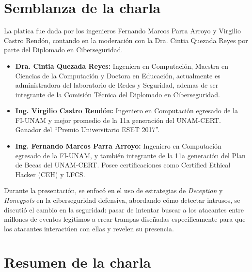 \documentclass[letterpaper,11pt]{article}
\begin{document}


\newpage

{\hypersetup{linkcolor=black}\tableofcontents}
\thispagestyle{estiloindice}


\newpage

\thispagestyle{fancy}
\setcounter{page}{1}
\singlespacing

\section{Semblanza de la charla}

La platica fue dada por los ingenieros 
Fernando Marcos Parra Arroyo y 
Virgilio Castro Rendón, 
contando en la moderación con la Dra. Cintia Quezada Reyes 
por parte del Diplomado en Ciberseguridad. 

\begin{itemize}
    \item \textbf{Dra. Cintia Quezada Reyes:} Ingeniera en Computación, Maestra en Ciencias de la Computación y Doctora en Educación, 
    actualmente es administradora del laboratorio de Redes 
    y Seguridad, ademas de ser integrante de la Comisión 
    Técnica del Diplomado en Ciberseguridad.
    
    \item \textbf{Ing. Virgilio Castro Rendón:} Ingeniero en Computación egresado de la FI-UNAM y 
    mejor promedio de la 11a generación del UNAM-CERT. 
    Ganador del ``Premio Universitario ESET 2017''. 
    
    \item \textbf{Ing. Fernando Marcos Parra Arroyo:} Ingeniero en Computación egresado de la FI-UNAM, 
    y también integrante de la 11a generación del Plan de Becas del UNAM-CERT. 
    Posee certificaciones como Certified Ethical Hacker (CEH) y LFCS.
\end{itemize}

Durante la presentación, se enfocó en el uso de estrategias 
de \textit{Deception} y \textit{Honeypots} 
en la ciberseguridad defensiva, 
abordando cómo detectar intrusos, 
se discutió el cambio 
en la seguridad: pasar de intentar buscar a los atacantes 
entre millones de eventos legítimos
a crear trampas diseñadas específicamente para que 
los atacantes interactúen con ellas y revelen su presencia.

\section{Resumen de la charla}
\end{document}
